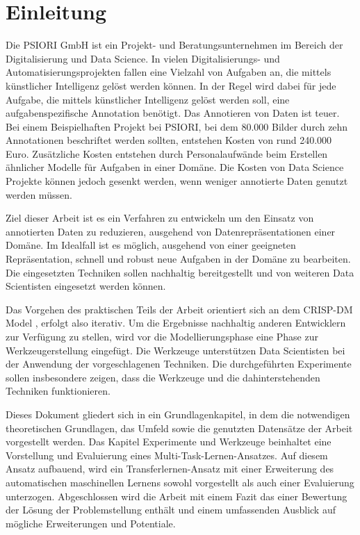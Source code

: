 \chapter{Einleitung}
\label{chap:Einleitung}
	Die PSIORI GmbH \cite{PSIORIGmbH.2020} ist ein Projekt- und Beratungsunternehmen im Bereich der Digitalisierung und Data Science. In vielen Digitalisierungs- und Automatisierungsprojekten fallen eine Vielzahl von Aufgaben an, die mittels künstlicher Intelligenz gelöst werden können. In der Regel wird dabei für jede Aufgabe, die mittels künstlicher Intelligenz gelöst werden soll, eine aufgabenspezifische Annotation benötigt. Das Annotieren von Daten ist teuer. Bei einem Beispielhaften Projekt bei PSIORI, bei dem 80.000 Bilder durch zehn Annotationen beschriftet werden sollten, entstehen Kosten von rund 240.000 Euro. Zusätzliche Kosten entstehen durch Personalaufwände beim Erstellen ähnlicher Modelle für Aufgaben in einer Domäne. Die Kosten von Data Science Projekte können jedoch gesenkt werden, wenn weniger annotierte Daten genutzt werden müssen.
	
	Ziel dieser Arbeit ist es ein Verfahren zu entwickeln um den Einsatz von annotierten Daten zu reduzieren, ausgehend von Datenrepräsentationen einer Domäne. Im Idealfall ist es möglich, ausgehend von einer geeigneten Repräsentation, schnell und robust neue Aufgaben in der Domäne zu bearbeiten. Die eingesetzten Techniken sollen nachhaltig bereitgestellt und von weiteren Data Scientisten eingesetzt werden können.
	
	Das Vorgehen des praktischen Teils der Arbeit orientiert sich an dem CRISP-DM Model \cite{Shearer.2000}, erfolgt also iterativ. Um die Ergebnisse nachhaltig anderen Entwicklern zur Verfügung zu stellen, wird vor die Modellierungsphase eine Phase zur Werkzeugerstellung eingefügt. Die Werkzeuge unterstützen Data Scientisten bei der Anwendung der vorgeschlagenen Techniken. Die durchgeführten Experimente sollen insbesondere zeigen, dass die Werkzeuge und die dahinterstehenden Techniken funktionieren. 
	
	Dieses Dokument gliedert sich in ein Grundlagenkapitel, in dem die notwendigen theoretischen Grundlagen, das Umfeld sowie die genutzten Datensätze der Arbeit vorgestellt werden. Das Kapitel Experimente und Werkzeuge beinhaltet eine Vorstellung und Evaluierung eines Multi-Task-Lernen-Ansatzes. Auf diesem Ansatz aufbauend, wird ein Transferlernen-Ansatz mit einer Erweiterung des automatischen maschinellen Lernens sowohl vorgestellt als auch einer Evaluierung unterzogen. Abgeschlossen wird die Arbeit mit einem Fazit das einer Bewertung der Lösung der Problemstellung enthält und einem umfassenden Ausblick auf mögliche Erweiterungen und Potentiale.
